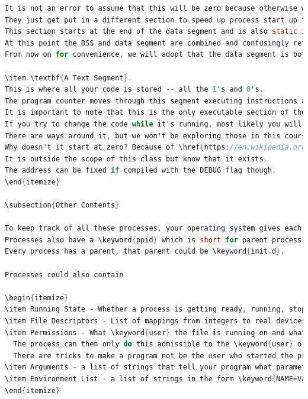 \begin{itemize}
\begin{lstlisting}[language=C]
It is not an error to assume that this will be zero because otherwise we'd have a security risk from other processes.
They just get put in a different section to speed up process start up time.
This section starts at the end of the data segment and is also static in size because the amount of globals is known at compile time.
At this point the BSS and data segment are combined and confusingly referred to as the data segment \cite[P. 124]{van1994expert}.
From now on for convenience, we will adopt that the data segment is both the data segment

\item \textbf{A Text Segment}.
This is where all your code is stored -- all the 1's and 0's.
The program counter moves through this segment executing instructions and moving down the next instruction.
It is important to note that this is the only executable section of the code created by default.
If you try to change the code while it's running, most likely you will segfaults.
There are ways around it, but we won't be exploring those in this course.
Why doesn't it start at zero? Because of \href{https://en.wikipedia.org/wiki/Address_space_layout_randomization}{Address Space Layout Randomization}.
It is outside the scope of this class but know that it exists.
The address can be fixed if compiled with the DEBUG flag though.
\end{itemize}

\subsection{Other Contents}

To keep track of all these processes, your operating system gives each process a number and that process is called the PID, process ID.
Processes also have a \keyword{ppid} which is short for parent process id.
Every process has a parent, that parent could be \keyword{init.d}.

Processes could also contain

\begin{itemize}
\item Running State - Whether a process is getting ready, running, stopped, terminated etc. (more on this during the Scheduling chapter).
\item File Descriptors - List of mappings from integers to real devices (files, usb sticks, sockets)
\item Permissions - What \keyword{user} the file is running on and what \keyword{group} the process belongs to.
  The process can then only do this admissible to the \keyword{user} or \keyword{group} like opening a file that the \keyword{user} has made exclusives.
  There are tricks to make a program not be the user who started the program i.e. \keyword{sudo} takes a program that a \keyword{user} starts and executes it as \keyword{root}.
\item Arguments - a list of strings that tell your program what parameters to run under
\item Environment List - a list of strings in the form \keyword{NAME=VALUE} that one can modify.
\end{itemize}


\end{lstlisting}
\end{itemize}
